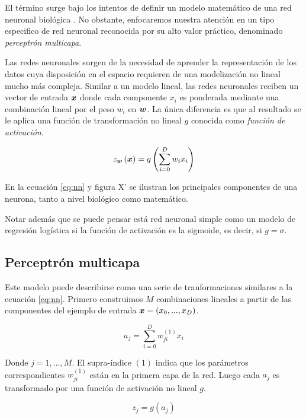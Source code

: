 El término surge bajo los intentos de definir un modelo matemático de una red
neuronal biológica \citep{}. No obstante, enfocaremos nuestra atención en un tipo
especifico de red neuronal reconocida por su alto valor práctico, denominado
\emph{perceptrón multicapa}.

Las redes neuronales surgen de la necesidad de aprender la representación de los
datos cuya disposición en el espacio requieren de una modelización no lineal
mucho más compleja. Similar a un modelo lineal, las redes neuronales reciben un
vector de entrada $\boldsymbol{x}$ donde cada componente $x_i$ es ponderada mediante
una combinación lineal por el peso $w_i$ en $\boldsymbol{w}$. La única diferencia es que
al resultado se le aplica una función de transformación no lineal $g$ conocida
como \emph{función de activación}.

\begin{equation} \label{eq:nn}
    z_{\boldsymbol{w}}\left( \boldsymbol{x} \right) = g\left( \sum_{i=0}^{D} w_i x_i \right)
\end{equation}

En la ecuación \ref{eq:nn} y figura X' se ilustran los principales componentes de una
neurona, tanto a nivel biológico como matemático.

Notar además que se puede pensar está red neuronal simple como un modelo de
regresión logística si la función de activación es la sigmoide, es decir, si $g
= \sigma$.

\subsection{Perceptrón multicapa}

Este modelo puede describirse como una serie de tranformaciones similares a la
ecuación \ref{eq:nn}. Primero construimos $M$ combinaciones lineales a partir de
las componentes del ejemplo de entrada $\boldsymbol{x} = (x_0, ..., x_D)$.

\begin{equation}
    a_j = \sum_{i = 0}^{D} w_{ji}^{(1)} x_{i}
\end{equation}

Donde $j = 1,..., M$. El supra-índice $(1)$ indica que los parámetros
correspondientes $w_{ji}^{(1)}$ están en la primera capa de la red. Luego cada
$a_j$ es transformado por una función de activación no lineal $g$.

\begin{equation}
    z_j = g(a_j)
\end{equation}

